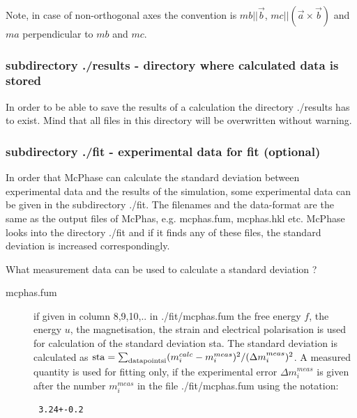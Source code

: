 
Note, in case of non-orthogonal axes the convention 
is $mb||\vec b$, $mc||(\vec a \times \vec b)$ and $ma$ perpendicular to $mb$ and $mc$.

\subsubsection{subdirectory {\prg ./results} - directory where calculated data is stored}

In order to be able to save the results of a calculation the directory {\prg ./results} has to
exist. Mind that all files in this directory will be overwritten without warning. 

\subsubsection{subdirectory {\prg ./fit} - experimental data for fit (optional) } 

In order that {\prg McPhase} can calculate the standard deviation between
 experimental data and the results of the simulation, some experimental data
 can be given in the subdirectory {\prg ./fit}. The filenames and the data-format
 are the same as the output files of {\prg McPhas}, e.g. {\prg mcphas.fum}, {\prg mcphas.hkl}
 etc. {\prg McPhase} looks into the directory {\prg ./fit} and if it finds any
 of these files, the standard deviation is increased correspondingly. 

What measurement data can be used to calculate a standard deviation ?

\begin{description}
\item[{\prg mcphas.fum}] if given in column 8,9,10,.. in {\prg ./fit/mcphas.fum} the
            free energy $f$, the energy $u$, the magnetisation, the strain and electrical polarisation
             is used for calculation
	    of the standard deviation sta. The standard deviation is calculated
	    as ${\rm sta}=\sum_{\rm data points i} ({m}_i^{calc}-{m}_i^{meas})^2/({\Delta m}_i^{meas})^2$.
	    A measured quantity is used for fitting only, if the experimental error ${\Delta m}_i^{meas}$ is given
            after the number ${m}_i^{meas}$ in the file {\prg ./fit/mcphas.fum} 
            using the notation: \begin{verbatim} 3.24+-0.2 \end{verbatim}

\end{description}

